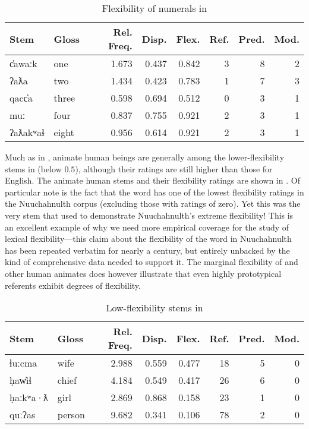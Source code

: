 \begin{table}[h!]
  \centering
  \caption{Flexibility of numerals in }
  \label{tab:Nuuchahnulth-numerals}
  \begin{tabular}{ l l r r r r r r }
    \toprule
    Stem & Gloss & Rel. Freq. & Disp. & Flex. & Ref. & Pred. & Mod.\\
    \midrule
    c̓awaːk   & one   & 1.673 & 0.437 & 0.842 & 3 & 8 & 2\\
    ʔaƛa     & two   & 1.434 & 0.423 & 0.783 & 1 & 7 & 3\\
    qacc̓a    & three & 0.598 & 0.694 & 0.512 & 0 & 3 & 1\\
    muː      & four  & 0.837 & 0.755 & 0.921 & 2 & 3 & 1\\
    ʔaƛakʷaɬ & eight & 0.956 & 0.614 & 0.921 & 2 & 3 & 1\\
    \bottomrule
  \end{tabular}
\end{table}

Much as in , animate human beings are generally among the lower-flexibility stems in  (below $0.5$), although their ratings are still higher than those for English. The animate human stems and their flexibility ratings are shown in . Of particular note is the fact that the word   has one of the lowest flexibility ratings in the Nuuchahnulth corpus (excluding those with ratings of zero). Yet this was the very stem that \textcite{Swadesh1939b} used to demonstrate Nuuchahnulth's extreme flexibility! This is an excellent example of why we need more empirical coverage for the study of lexical flexibility—this claim about the flexibility of the word  in Nuuchahnulth has been repeated verbatim for nearly a century, but entirely unbacked by the kind of comprehensive data needed to support it. The marginal flexibility of  and other human animates does however illustrate that even highly prototypical referents exhibit degrees of flexibility.

\begin{table}
  \centering
  \caption{Low-flexibility stems in }
  \label{tab:Nuuchahnulth-low-flexibility}
  \begin{tabular}{ l l r r r r r r }
    \toprule
    Stem     & Gloss  & Rel. Freq. & Disp. & Flex. & Ref. & Pred. & Mod.\\
    \midrule
    ɬuːcma   & wife   & 2.988      & 0.559 & 0.477 & 18   & 5     & 0  \\
    ḥaw̓iɬ    & chief  & 4.184      & 0.549 & 0.417 & 26   & 6     & 0  \\
    ḥaːkʷa·ƛ & girl   & 2.869      & 0.868 & 0.158 & 23   & 1     & 0  \\
    quːʔas   & person & 9.682      & 0.341 & 0.106 & 78   & 2     & 0  \\
    \bottomrule
  \end{tabular}
\end{table}

